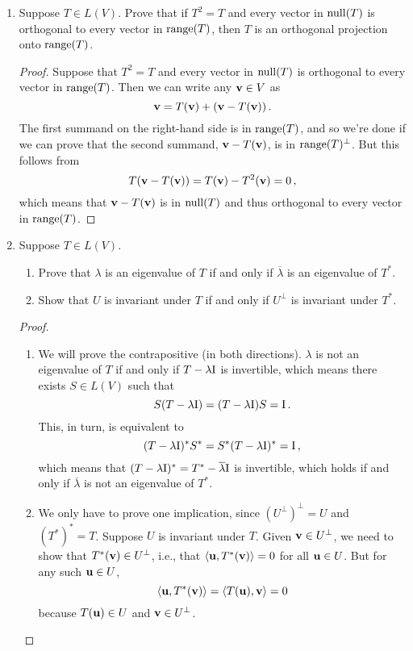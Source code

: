 \documentclass[11pt]{amsart}
\begin{document}
\begin{enumerate}[(1)]
\item Suppose $T \in L(V)$. Prove that if $T^2 = T$ and every vector in $\operatorname{null}(T)$ is orthogonal to every vector in $\operatorname{range}(T)$, then $T$ is an orthogonal projection onto $\operatorname{range}(T)$.

\begin{proof}
Suppose that $T^2 = T$ and every vector in $\operatorname{null}(T)$ is orthogonal to every vector in $\operatorname{range}(T)$.
Then we can write any $\mathbf v \in V$ as
\[
  \mathbf v = T(\mathbf v) + \left( \mathbf v - T(\mathbf v) \right) .
\]
The first summand on the right-hand side is in $\operatorname{range}(T)$, and so we're done if we can prove that the second summand, $\mathbf v - T(\mathbf v)$, is in $\operatorname{range}(T)^\perp$. But this follows from
\[
  T(\mathbf v - T(\mathbf v)) = T(\mathbf v) - T^2(\mathbf v) = 0 \, ,
\]
which means that $\mathbf v - T(\mathbf v)$ is in $\operatorname{null}(T)$ and thus orthogonal to every vector in $\operatorname{range}(T)$.
\end{proof}

\item Suppose $T \in L(V)$.
  \begin{enumerate}
  \item Prove that $\lambda$ is an eigenvalue of $T$ if and only if $\overline \lambda$ is an eigenvalue of $T^*$.
  \item Show that $U$ is invariant under $T$ if and only if $U^\perp$ is invariant under $T^*$.
  \end{enumerate}

\begin{proof}
\begin{enumerate}

\item We will prove the contrapositive (in both directions).
$\lambda$ is not an eigenvalue of $T$ if and only if $T - \lambda \mathrm I$ is invertible, which means there exists $S \in L(V)$ such that
\[
  S(T - \lambda \mathrm I) = (T - \lambda \mathrm I)S = \mathrm I \, .
\]
This, in turn, is equivalent to
\[
  (T - \lambda \mathrm I)^* S^* = S^* (T - \lambda \mathrm I)^* = \mathrm I \, ,
\]
which means that $(T - \lambda \mathrm I)^* = T^* - \overline \lambda \mathrm I$ is invertible, which holds if and only if $\overline \lambda$ is not an eigenvalue of $T^*$.

\item We only have to prove one implication, since $(U^\perp)^\perp = U$ and $(T^*)^* = T$.
Suppose $U$ is invariant under $T$. Given $\mathbf v \in U^\perp$, we need to show that $T^*(\mathbf v) \in U^\perp$, i.e., that $\left< \mathbf u, T^*(\mathbf v) \right> = 0$ for all $\mathbf u \in U$. But for any such $\mathbf u \in U$,
\[
  \left< \mathbf u, T^*(\mathbf v) \right> = \left< T(\mathbf u), \mathbf v \right> = 0
\]
because $T(\mathbf u) \in U$ and $\mathbf v \in U^\perp$. \qedhere


\end{enumerate}
\end{proof}
\end{enumerate}
\end{document}

